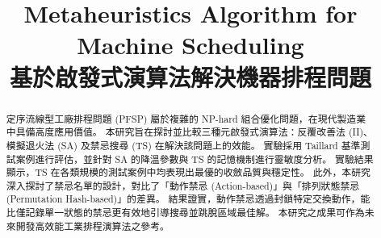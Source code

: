 \documentclass[conference]{IEEEtran}
\begin{document}
\title{Metaheuristics Algorithm for Machine Scheduling\\
{\footnotesize 基於啟發式演算法解決機器排程問題}
}


\author{
\and
{}
\and
{}
}



\maketitle

\begin{abstract}

定序流線型工廠排程問題 (PFSP) 屬於複雜的 NP-hard 組合優化問題，在現代製造業中具備高度應用價值。
本研究旨在探討並比較三種元啟發式演算法：反覆改善法 (II)、模擬退火法 (SA) 及禁忌搜尋 (TS) 在解決該問題上的效能。
實驗採用 Taillard 基準測試案例進行評估，並針對 SA 的降溫參數與 TS 的記憶機制進行靈敏度分析。
實驗結果顯示，TS 在各類規模的測試案例中均表現出最優的收斂品質與穩定性。
此外，本研究深入探討了禁忌名單的設計，對比了「動作禁忌 (Action-based)」與「排列狀態禁忌 (Permutation Hash-based)」的差異。
結果證實，動作禁忌透過封鎖特定交換動作，能比僅記錄單一狀態的禁忌更有效地引導搜尋並跳脫區域最佳解。
本研究之成果可作為未來開發高效能工業排程演算法之參考。
\end{abstract}
\end{document}
